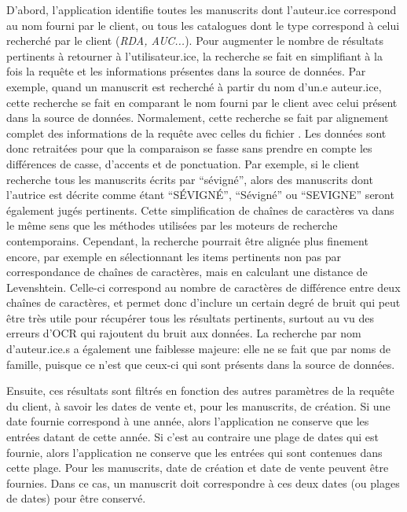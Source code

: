 D'abord, l'application identifie toutes les manuscrits dont l'auteur.ice correspond au nom fourni par le client, ou tous les catalogues dont le type correspond à celui recherché par le client (\textit{RDA, AUC...}). Pour augmenter le nombre de résultats pertinents à retourner à l'utilisateur.ice, la recherche se fait en simplifiant à la fois la requête et les informations présentes dans la source de données. Par exemple, quand un manuscrit est recherché à partir du nom d'un.e auteur.ice, cette recherche se fait en comparant le nom fourni par le client avec celui présent dans la source de données. Normalement, cette recherche se fait par alignement complet des informations de la requête avec celles du fichier \json{}. Les données sont donc retraitées pour que la comparaison se fasse sans prendre en compte les différences de casse, d'accents et de ponctuation. Par exemple, si le client recherche tous les manuscrits écrits par \enquote{sévigné}, alors des manuscrits dont l'autrice est décrite comme étant \enquote{SÉVIGNÉ}, \enquote{Sévigné} ou \enquote{SEVIGNE} seront également jugés pertinents. Cette simplification de chaînes de caractères va dans le même sens que les méthodes utilisées par les moteurs de recherche contemporains. Cependant, la recherche pourrait être alignée plus finement encore, par exemple en sélectionnant les items pertinents non pas par correspondance de chaînes de caractères, mais en calculant une distance de Levenshtein. Celle-ci correspond au nombre de caractères de différence entre deux chaînes de caractères, et permet donc d'inclure un certain degré de bruit qui peut être très utile pour récupérer tous les résultats pertinents, surtout au vu des erreurs d'OCR qui rajoutent du bruit aux données. La recherche par nom d'auteur.ice.s a également une faiblesse majeure: elle ne se fait que par noms de famille, puisque ce n'est que ceux-ci qui sont présents dans la source de données.

Ensuite, ces résultats sont filtrés en fonction des autres paramètres de la requête du client, à savoir les dates de vente et, pour les manuscrits, de création. Si une date fournie correspond à une année, alors l'application ne conserve que les entrées datant de cette année. Si c'est au contraire une plage de dates qui est fournie, alors l'application ne conserve que les entrées qui sont contenues dans cette plage. Pour les manuscrits, date de création et date de vente peuvent être fournies. Dans ce cas, un manuscrit doit correspondre à ces deux dates (ou plages de dates) pour être conservé.

